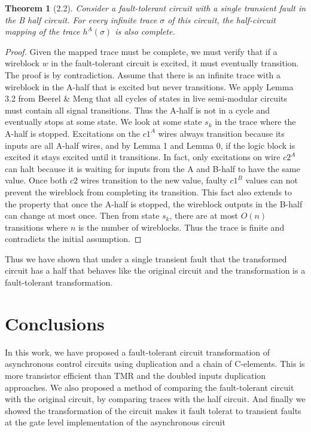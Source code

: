 \documentclass[12pt]{report}
\newtheorem*{theorem}{Theorem}
\begin{document}
\begin{theorem}[2.2]
Consider a fault-tolerant circuit with a single transient fault in the B half circuit.  For every infinite trace $\sigma$ of this circuit, the half-circuit mapping of the trace $h^{A}(\sigma)$ is also complete.  
\end{theorem}
\begin{proof}
Given the mapped trace must be complete, we must verify that if a wireblock $w$ in the fault-tolerant circuit is excited, it must eventually transition.  The proof is by contradiction.  Assume that there is an infinite trace with a wireblock in the A-half that is excited but never transitions.  We apply Lemma 3.2 from Beerel \& Meng that all cycles of states in live semi-modular circuits must contain all signal transitions.  Thus the A-half is not in a cycle and eventually stops at some state.  We look at some state $s_k$ in the trace where the A-half is stopped.  Excitations on the $c1^A$ wires always transition because its inputs are all A-half wires, and by Lemma 1 and Lemma 0, if the logic block is excited it stays excited until it transitions.  In fact, only excitations on wire $c2^A$ can halt because it is waiting for inputs from the A and B-half to have the same value.  Once both $c2$ wires transition to the new value, faulty $c1^B$ values can not prevent the wireblock from completing its transition.  This fact also extends to the property that once the A-half is stopped, the wireblock outputs in the B-half can change at most once.  Then from state $s_k$, there are at most $O(n)$ transitions where $n$ is the number of wireblocks.  Thus the trace is finite and contradicts the initial assumption.

\end{proof}

Thus we have shown that under a single transient fault that the transformed circuit has a half that behaves like the original circuit and the transformation is a fault-tolerant transformation.


\chapter{Conclusions}
In this work, we have proposed a fault-tolerant circuit transformation of asynchronous control circuits using duplication and a chain of C-elements.  This is more transistor efficient than TMR and the doubled inputs duplication approaches.  We also proposed a method of comparing the fault-tolerant circuit with the original circuit, by comparing traces with the half circuit.  And finally we showed the transformation of the circuit makes it fault tolerat to transient faults at the gate level implementation of the asynchronous circuit\\
\end{document}
